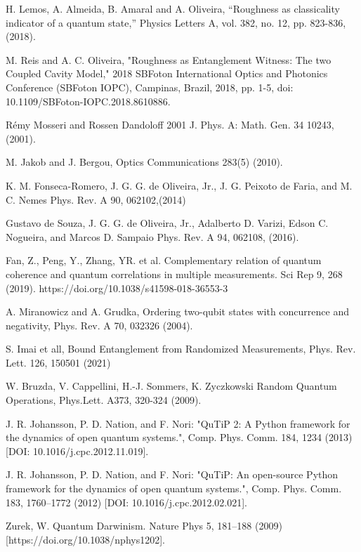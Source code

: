 \documentclass[aps,prl,preprint]{revtex4-1}
\begin{document}
\begin{thebibliography}{99}
		 H. Lemos, A. Almeida, B. Amaral and A. Oliveira,
		``Roughness as classicality indicator of a quantum state,'' Physics Letters
		A, vol. 382, no. 12, pp. 823-836, (2018).
		
		
		 M. Reis and A. C. Oliveira, "Roughness as Entanglement Witness: The two Coupled Cavity Model," 2018 SBFoton International Optics and Photonics Conference (SBFoton IOPC), Campinas, Brazil, 2018, pp. 1-5, doi: 10.1109/SBFoton-IOPC.2018.8610886.
		
		 R\'emy Mosseri and Rossen Dandoloff 2001 J. Phys. A: Math. Gen. 34 10243, (2001).
		
		
		 M. Jakob and J. Bergou, Optics Communications 283(5) (2010). 
		
		 K. M. Fonseca-Romero, J. G. G. de Oliveira, Jr., J. G. Peixoto de Faria, and M. C. Nemes
		Phys. Rev. A 90, 062102,(2014)
		
		 Gustavo de Souza, J. G. G. de Oliveira, Jr., Adalberto D. Varizi, Edson C. Nogueira, and Marcos D. Sampaio
		Phys. Rev. A 94, 062108, (2016).
		
		
		 Fan, Z., Peng, Y., Zhang, YR. et al. Complementary relation of quantum coherence and quantum correlations in multiple measurements. Sci Rep 9, 268 (2019). https://doi.org/10.1038/s41598-018-36553-3
		
		 A. Miranowicz and A. Grudka, Ordering two-qubit states with concurrence and negativity, Phys. Rev. A 70, 032326 (2004).
		
		 S. Imai et all, Bound Entanglement from Randomized Measurements, Phys. Rev. Lett.  126, 150501 (2021)
		
		 W.  Bruzda, V. Cappellini, H.-J. Sommers, K. Zyczkowski
		Random Quantum Operations, Phys.Lett. A373, 320-324 (2009).
		
		 J. R. Johansson, P. D. Nation, and F. Nori: "QuTiP 2: A Python framework for the dynamics of open quantum systems.", Comp. Phys. Comm. 184, 1234 (2013) [DOI: 10.1016/j.cpc.2012.11.019].
		
		 J. R. Johansson, P. D. Nation, and F. Nori: "QuTiP: An open-source Python framework for the dynamics of open quantum systems.", Comp. Phys. Comm. 183, 1760–1772 (2012) [DOI: 10.1016/j.cpc.2012.02.021].
		
		 Zurek, W. Quantum Darwinism. Nature Phys 5, 181–188 (2009)  [https://doi.org/10.1038/nphys1202].
		
	\end{thebibliography}
	
\end{document}
